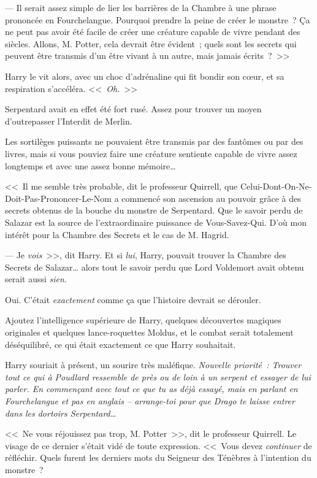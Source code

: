 --- Il serait assez simple de lier les barrières de la Chambre à une phrase prononcée en Fourchelangue. Pourquoi prendre la peine de créer le monstre~? Ça ne peut pas avoir été facile de créer une créature capable de vivre pendant des siècles. Allons, M. Potter, cela devrait être évident~; quels sont les secrets qui peuvent être transmis d'un être vivant à un autre, mais jamais écrits~?~>>

Harry le vit alors, avec un choc d'adrénaline qui fit bondir son cœur, et sa respiration s'accéléra. <<~\emph{Oh.}~>>

Serpentard avait en effet été fort rusé. Assez pour trouver un moyen d'outrepasser l'Interdit de Merlin.

Les sortilèges puissants ne pouvaient être transmis par des fantômes ou par des livres, mais si vous pouviez faire une créature sentiente capable de vivre assez longtemps et avec une assez bonne mémoire…

<<~Il me semble très probable, dit le professeur Quirrell, que Celui-Dont-On-Ne-Doit-Pas-Prononcer-Le-Nom a commencé son ascension au pouvoir grâce à des secrets obtenus de la bouche du monstre de Serpentard. Que le savoir perdu de Salazar est la source de l'extraordinaire puissance de Vous-Savez-Qui. D'où mon intérêt pour la Chambre des Secrets et le cas de M. Hagrid.

--- Je \emph{vois}~>>, dit Harry. Et si \emph{lui}, Harry, pouvait trouver la Chambre des Secrets de Salazar… alors tout le savoir perdu que Lord Voldemort avait obtenu serait aussi \emph{sien}.

Oui. C'était \emph{exactement} comme ça que l'histoire devrait se dérouler.

Ajoutez l'intelligence supérieure de Harry, quelques découvertes magiques originales et quelques lance-roquettes Moldus, et le combat serait totalement déséquilibré, ce qui était exactement ce que Harry souhaitait.

Harry souriait à présent, un sourire très maléfique. \emph{Nouvelle priorité~: Trouver tout ce qui à Poudlard ressemble de près ou de loin à un serpent et essayer de lui parler. En commençant avec tout ce que tu as déjà essayé, mais en parlant en Fourchelangue et pas en anglais -- arrange-toi pour que Drago te laisse entrer dans les dortoirs Serpentard…}

<<~Ne vous réjouissez pas trop, M. Potter~>>, dit le professeur Quirrell. Le visage de ce dernier s'était vidé de toute expression. <<~Vous devez \emph{continuer} de réfléchir. Quels furent les derniers mots du Seigneur des Ténèbres à l'intention du monstre~?

